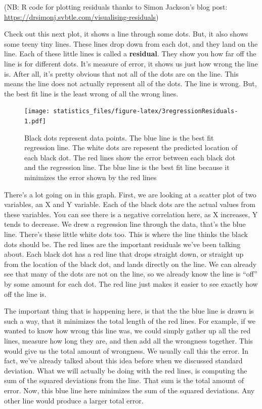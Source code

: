 \documentclass[]{book}
\begin{document}
(NB: R code for plotting residuals thanks to Simon Jackson's blog post: \url{https://drsimonj.svbtle.com/visualising-residuals})

Check out this next plot, it shows a line through some dots. But, it also shows some teeny tiny lines. These lines drop down from each dot, and they land on the line. Each of these little lines is called a \textbf{residual}. They show you how far off the line is for different dots. It's measure of error, it shows us just how wrong the line is. After all, it's pretty obvious that not all of the dots are on the line. This means the line does not actually represent all of the dots. The line is wrong. But, the best fit line is the least wrong of all the wrong lines.

\begin{figure}
\centering
\texttt{[image: statistics\_files/figure-latex/3regressionResiduals-1.pdf]}
\caption{\label{fig:3regressionResiduals}Black dots represent data points. The blue line is the best fit regression line. The white dots are repesent the predicted location of each black dot. The red lines show the error between each black dot and the regression line. The blue line is the best fit line because it minimizes the error shown by the red lines}
\end{figure}

There's a lot going on in this graph. First, we are looking at a scatter plot of two variables, an X and Y variable. Each of the black dots are the actual values from these variables. You can see there is a negative correlation here, as X increases, Y tends to decrease. We drew a regression line through the data, that's the blue line. There's these little white dots too. This is where the line thinks the black dots should be. The red lines are the important residuals we've been talking about. Each black dot has a red line that drops straight down, or straight up from the location of the black dot, and lands directly on the line. We can already see that many of the dots are not on the line, so we already know the line is ``off'' by some amount for each dot. The red line just makes it easier to see exactly how off the line is.

The important thing that is happening here, is that the the blue line is drawn is such a way, that it minimizes the total length of the red lines. For example, if we wanted to know how wrong this line was, we could simply gather up all the red lines, measure how long they are, and then add all the wrongness together. This would give us the total amount of wrongness. We usually call this the error. In fact, we've already talked about this idea before when we discussed standard deviation. What we will actually be doing with the red lines, is computing the sum of the squared deviations from the line. That sum is the total amount of error. Now, this blue line here minimizes the sum of the squared deviations. Any other line would produce a larger total error.
\end{document}
